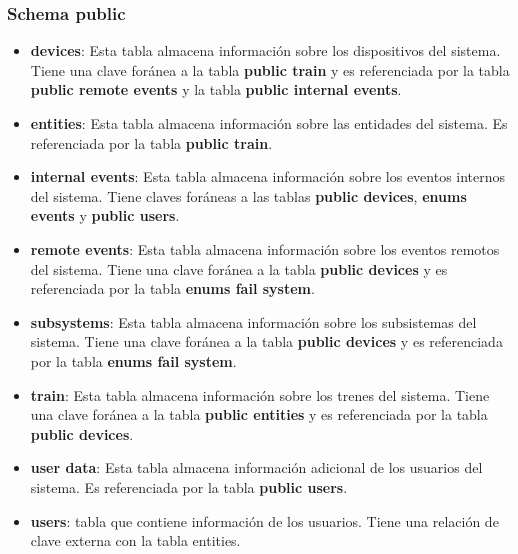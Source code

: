 \subsubsection{Schema public}

\begin{itemize}

  \item \textbf{devices}: Esta tabla almacena información sobre los dispositivos del sistema. Tiene una clave foránea a la tabla \textbf{public train} y es referenciada por la tabla \textbf{public remote events} y la tabla \textbf{public internal events}.

  \item \textbf{entities}: Esta tabla almacena información sobre las entidades del sistema. Es referenciada por la tabla \textbf{public train}.

  \item \textbf{internal events}: Esta tabla almacena información sobre los eventos internos del sistema. Tiene claves foráneas a las tablas \textbf{public devices}, \textbf{enums events} y \textbf{public users}.

  \item \textbf{remote events}: Esta tabla almacena información sobre los eventos remotos del sistema. Tiene una clave foránea a la tabla \textbf{public devices} y es referenciada por la tabla \textbf{enums fail system}.

  \item \textbf{subsystems}: Esta tabla almacena información sobre los subsistemas del sistema. Tiene una clave foránea a la tabla \textbf{public devices} y es referenciada por la tabla \textbf{enums fail system}.

  \item \textbf{train}: Esta tabla almacena información sobre los trenes del sistema. Tiene una clave foránea a la tabla \textbf{public entities} y es referenciada por la tabla \textbf{public devices}.

  \item \textbf{user data}: Esta tabla almacena información adicional de los usuarios del sistema. Es referenciada por la tabla \textbf{public users}.

  \item \textbf{users}: tabla que contiene información de los usuarios. Tiene una relación de clave externa con la tabla entities.

\end{itemize}



